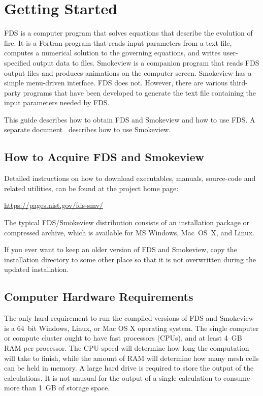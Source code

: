 \documentclass[11pt]{book}
\begin{document}
\chapter{Getting Started}
\label{info:gettingstarted}

FDS is a computer program that solves equations that describe the evolution of fire. It is a Fortran program that reads input parameters from a text file, computes a numerical solution to the governing equations, and writes user-specified output data to files. Smokeview is a companion program that reads FDS output files and produces animations on the computer screen. Smokeview has a simple menu-driven interface. FDS does not. However, there are various third-party programs that have been developed to generate the text file containing the input parameters needed by FDS.

This guide describes how to obtain FDS and Smokeview and how to use FDS. A separate document~\cite{Smokeview_Users_Guide} describes how to use Smokeview.

\section{How to Acquire FDS and Smokeview}
\label{info:acquire}

Detailed instructions on how to download executables, manuals, source-code and related utilities, can be found at the project home page:

\begin{center}
\href{https://pages.nist.gov/fds-smv/}{{\ct https://pages.nist.gov/fds-smv/}}
\end{center}

\noindent
The typical FDS/Smokeview distribution consists of an installation package or compressed archive, which is available for MS Windows, Mac~OS~X, and Linux.

If you ever want to keep an older version of FDS and Smokeview, copy the installation directory to some other place so that it is not overwritten during the updated installation.


\section{Computer Hardware Requirements}

The only hard requirement to run the compiled versions of FDS and Smokeview is a 64~bit Windows, Linux, or Mac OS X operating system. The single computer or compute cluster ought to have fast processors (CPUs), and at least 4~GB RAM per processor. The CPU speed will determine how long the computation will take to finish, while the amount of RAM will determine how many mesh cells can be held in memory. A large hard drive is required to store the output of the calculations. It is not unusual for the output of a single calculation to consume more than 1~GB of storage space.
\end{document}
